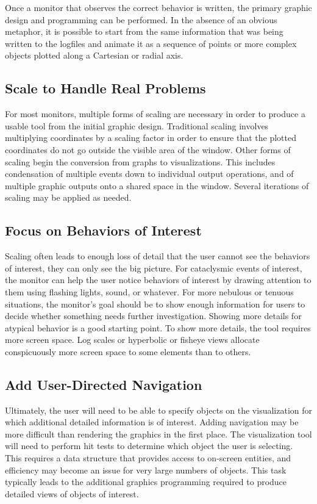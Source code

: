 Once a monitor that observes the correct behavior is written, the primary
graphic design and programming can be performed.  In the absence of an
obvious metaphor, it is possible to start from the same information that
was being written to the logfiles and animate it as a sequence of points or
more complex objects plotted along a Cartesian or radial axis.

\subsection*{Scale to Handle Real Problems}

For most monitors, multiple forms of scaling are necessary in order to
produce a usable tool from the initial graphic design.  Traditional scaling
involves multiplying coordinates by a scaling factor in order to ensure
that the plotted coordinates do not go outside the visible area of the
window.  Other forms of scaling begin the conversion from graphs to
visualizations. This includes condensation of multiple events down to
individual output operations, and of multiple graphic outputs onto
a shared space in the window.  Several iterations of scaling may be applied
as needed.

\subsection*{Focus on Behaviors of Interest}

Scaling often leads to enough loss of detail that the user cannot see the
behaviors of interest, they can only see the big picture.  For cataclysmic
events of interest, the monitor can help the user notice behaviors of
interest by drawing attention to them using flashing lights, sound, or
whatever. For more nebulous or tenuous situations, the monitor's goal should
be to show enough information for users to decide whether something needs
further investigation.  Showing more details for atypical behavior is a good
starting point.  To show more details, the tool requires more screen space.
Log scales or hyperbolic or fisheye views allocate conspicuously more screen
space to some elements than to others.


\subsection*{Add User-Directed Navigation}

Ultimately, the user will need to be able to specify objects on the
visualization for which additional detailed information is of interest.
Adding navigation may be more difficult than rendering the graphics in the
first place.  The visualization tool will need to perform hit tests to
determine which object the user is selecting.  This requires a data
structure that provides access to on-screen entities, and efficiency may
become an issue for very large numbers of objects.  This task typically
leads to the additional graphics programming required to produce detailed
views of objects of interest.


